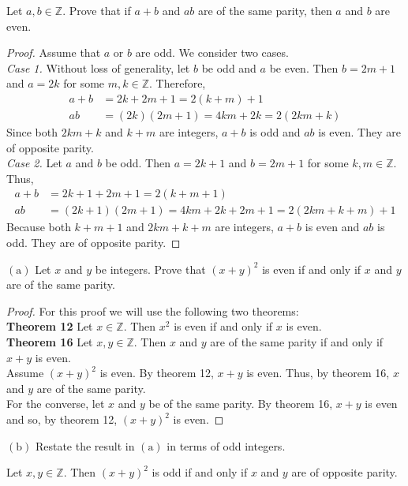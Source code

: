 \documentclass[12pt]{article}
\newcommand{\Z}{\mathbb{Z}}
\newenvironment{problem}[2][Problem]{\begin{trivlist}
		\item[\hskip \labelsep {\bfseries #1}\hskip \labelsep {\bfseries #2.}]}{\end{trivlist}}
\newenvironment{solution}[2][Solution]{\begin{trivlist}
		\item[\hskip \labelsep {\bfseries #1}\hskip \labelsep {\bfseries #2.}]}{\end{trivlist}}
\begin{document}
\begin{problem}{31}
	Let $a,b\in \Z$. Prove that if $a+b$ and $ab$ are of the same parity, then $a$ and $b$ are even.
	\begin{proof}
		Assume that $a$ or $b$ are odd. We consider two cases.\\
		\textit{Case 1.} Without loss of generality, let $b$ be odd and $a$ be even. Then $b=2m+1$ and $a=2k$ for some $m,k \in \Z$. Therefore,
		\begin{align*}
			a+b&=2k+2m+1=2(k+m)+1\\
			ab &= (2k)(2m+1)=4km+2k=2(2km+k)
		\end{align*}
	Since both $2km+k$ and $k+m$ are integers, $a+b$ is odd and $ab$ is even. They are of opposite parity.\\
	
	\textit{Case 2.} Let $a$ and $b$ be odd. Then $a=2k+1$ and $b=2m+1$ for some $k,m \in \Z$. Thus,
	\begin{align*}
		a+b &= 2k+1+2m+1=2(k+m+1)\\
		ab &= (2k+1)(2m+1) = 4km+2k+2m+1=2(2km+k+m)+1
	\end{align*}
	Because both $k+m+1$ and $2km+k+m$ are integers, $a+b$ is even and $ab$ is odd. They are of opposite parity.
	\end{proof}
\end{problem}

\begin{problem}{32}
	$(\text{a})$ Let $x$ and $y$ be integers. Prove that $(x+y)^{2}$ is even if and only if $x$ and $y$ are of the same parity.
	\begin{proof}
		For this proof we will use the following two theorems:\\
		\textbf{Theorem 12} Let $x\in \Z$. Then $x^{2}$ is even if and only if $x$ is even.\\
		\textbf{Theorem 16} Let $x,y\in \Z$. Then $x$ and $y$ are of the same parity if and only if $x+y$ is even.\\
		
		Assume $(x+y)^{2}$ is even. By theorem 12, $x+y$ is even. Thus, by theorem 16, $x$ and $y$ are of the same parity.\\
		For the converse, let $x$ and $y$ be of the same parity. By theorem 16, $x+y$ is even and so, by theorem 12, $(x+y)^{2}$ is even.
	\end{proof}

	$(\text{b})$ Restate the result in $(\text{a})$ in terms of odd integers.
	\begin{solution}{}
		Let $x,y\in \Z$. Then $(x+y)^{2}$ is odd if and only if $x$ and $y$ are of opposite parity.
	\end{solution}
\end{problem}
\end{document}
